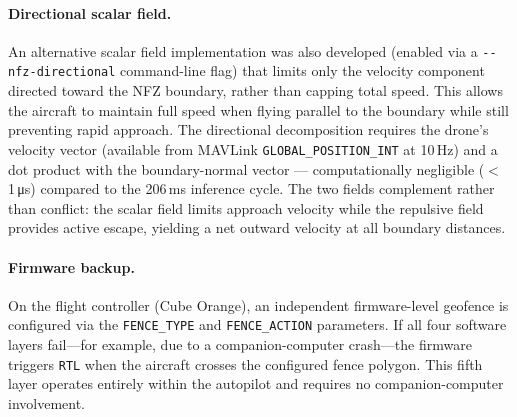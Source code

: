 \paragraph{Directional scalar field.}
An alternative scalar field implementation was also developed (enabled via a \texttt{-{}-nfz-directional} command-line flag) that limits only the velocity component directed toward the NFZ boundary, rather than capping total speed. This allows the aircraft to maintain full speed when flying parallel to the boundary while still preventing rapid approach. The directional decomposition requires the drone's velocity vector (available from MAVLink \texttt{GLOBAL\_POSITION\_INT} at 10\,Hz) and a dot product with the boundary-normal vector --- computationally negligible ($<$1\,\si{\micro\second}) compared to the 206\,ms inference cycle. The two fields complement rather than conflict: the scalar field limits approach velocity while the repulsive field provides active escape, yielding a net outward velocity at all boundary distances.

\paragraph{Firmware backup.}
On the flight controller (Cube Orange), an independent firmware-level geofence is configured via the \texttt{FENCE\_TYPE} and \texttt{FENCE\_ACTION} parameters. If all four software layers fail---for example, due to a companion-computer crash---the firmware triggers \texttt{RTL} when the aircraft crosses the configured fence polygon. This fifth layer operates entirely within the autopilot and requires no companion-computer involvement.
